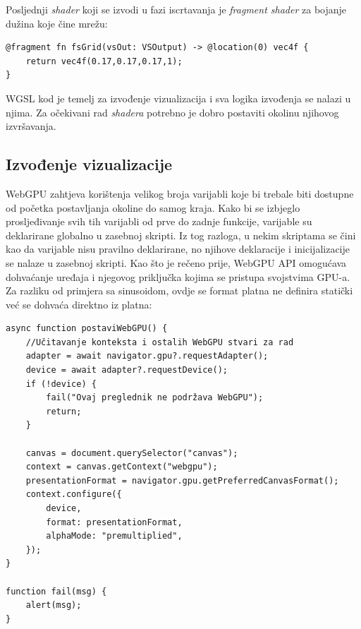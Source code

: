 \documentclass{foi}
\begin{document}
Posljednji \textit{shader} koji se izvodi u fazi iscrtavanja je \textit{fragment shader} za bojanje dužina koje čine mrežu:

\begin{verbatim}
@fragment fn fsGrid(vsOut: VSOutput) -> @location(0) vec4f {
	return vec4f(0.17,0.17,0.17,1);
}
\end{verbatim}

WGSL kod je temelj za izvođenje vizualizacija i sva logika izvođenja se nalazi u njima. Za očekivani rad \textit{shadera} potrebno je dobro postaviti okolinu njihovog izvršavanja.

\subsection{Izvođenje vizualizacije}

WebGPU zahtjeva korištenja velikog broja varijabli koje bi trebale biti dostupne od početka postavljanja okoline do samog kraja. Kako bi se izbjeglo prosljeđivanje svih tih varijabli od prve do zadnje funkcije, varijable su deklarirane globalno u zasebnoj skripti. Iz tog razloga, u nekim skriptama se čini kao da varijable nisu pravilno deklarirane, no njihove deklaracije i inicijalizacije se nalaze u zasebnoj skripti. Kao što je rečeno prije, WebGPU API omogućava dohvaćanje uređaja i njegovog priključka kojima se pristupa svojstvima GPU-a. Za razliku od primjera sa sinusoidom, ovdje se format platna ne definira statički već se dohvaća direktno iz platna:
\begin{verbatim}
async function postaviWebGPU() {
	//Učitavanje konteksta i ostalih WebGPU stvari za rad
	adapter = await navigator.gpu?.requestAdapter();
	device = await adapter?.requestDevice();
	if (!device) {
		fail("Ovaj preglednik ne podržava WebGPU");
		return;
	}
	
	canvas = document.querySelector("canvas");
	context = canvas.getContext("webgpu");
	presentationFormat = navigator.gpu.getPreferredCanvasFormat();
	context.configure({
		device,
		format: presentationFormat,
		alphaMode: "premultiplied",
	});
}

function fail(msg) {
	alert(msg);
}

\end{verbatim}
\end{document}
